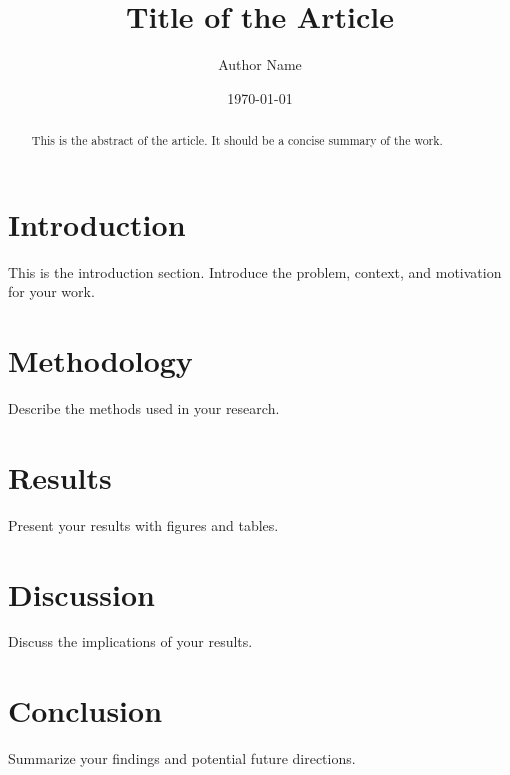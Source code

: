 \documentclass[aps,prd,twocolumn,superscriptaddress,nofootinbib]{revtex4-2}
\begin{document}
\title{Title of the Article}
\author{Author Name}
\date{\today}

\begin{abstract}
This is the abstract of the article. It should be a concise summary of the work.
\end{abstract}

\maketitle

\section{Introduction}
This is the introduction section. Introduce the problem, context, and motivation for your work.

\section{Methodology}
Describe the methods used in your research.

\section{Results}
Present your results with figures and tables.

\section{Discussion}
Discuss the implications of your results.

\section{Conclusion}
Summarize your findings and potential future directions.



\end{document}
